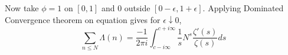 Now take $\phi=1$ on $[0,1]$ and $0$ outside $[0-\epsilon, 1+\epsilon]$. 
Applying Dominated Convergence theorem on equation \label{mellinonzeta} gives for $\epsilon \downarrow 0$,
\[
    \sum_{n\leq N} \Lambda(n)=
    \frac{-1}{2\pi i}\int_{c-i\infty}^{c+i\infty}
    \frac{1}{s} N^s \frac{\zeta'(s)}{\zeta(s)} ds
\]

